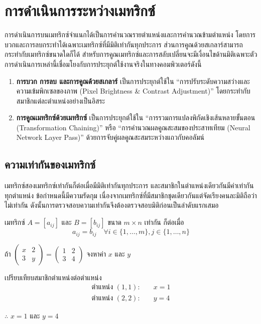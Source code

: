 \section{การดำเนินการระหว่างเมทริกซ์}
\label{sec:matrix-operations}

การดำเนินการบนเมทริกซ์จำแนกได้เป็นการคำนวณรายตำแหน่งและการคำนวณข้ามตำแหน่ง โดยการบวกและการลบกระทำได้เฉพาะเมทริกซ์ที่มีมิติเท่ากันทุกประการ ส่วนการคูณด้วยสเกลาร์สามารถกระทำกับเมทริกซ์ขนาดใดก็ได้ สำหรับการคูณเมทริกซ์และการสลับเปลี่ยนจะมีเงื่อนไขด้านมิติเฉพาะตัว การดำเนินการเหล่านี้เชื่อมโยงกับการประยุกต์ใช้งานจริงในทางคอมพิวเตอร์ดังนี้~\parencite{kolman2008discrete}
\begin{enumerate}[label=\textbf{\arabic*.}]
    \item \textbf{การบวก การลบ และการคูณด้วยสเกลาร์} เป็นการประยุกต์ใช้ใน ``การปรับระดับความสว่างและความเข้มพิกเซลของภาพ (Pixel Brightness \& Contrast Adjustment)'' โดยกระทำกับสมาชิกแต่ละตำแหน่งอย่างเป็นอิสระ
    \item \textbf{การคูณเมทริกซ์ด้วยเมทริกซ์} เป็นการประยุกต์ใช้ใน ``การรวมการแปลงพิกัดเชิงเส้นหลายขั้นตอน (Transformation Chaining)'' หรือ ``การคำนวณผลคูณสะสมของประสาทเทียม (Neural Network Layer Pass)'' ด้วยการจับคู่ผลคูณสะสมระหว่างแถวกับคอลัมน์
\end{enumerate}

\subsection{ความเท่ากันของเมทริกซ์}
\label{ssec:matrix-equality}
เมทริกซ์สองเมทริกซ์เท่ากันก็ต่อเมื่อมีมิติเท่ากันทุกประการ และสมาชิกในตำแหน่งเดียวกันมีค่าเท่ากันทุกตำแหน่ง ข้อกำหนดนี้มีความรัดกุม เนื่องจากเมทริกซ์ที่มีสมาชิกชุดเดียวกันแต่จัดเรียงคนละมิติถือว่าไม่เท่ากัน ดังนั้นการตรวจสอบความเท่ากันจึงต้องตรวจสอบมิติก่อนเป็นลำดับแรกเสมอ~\parencite{lipschutz2009discrete}

\begin{definition}
เมทริกซ์ $A = [a_{ij}]$ และ $B = [b_{ij}]$ ขนาด $m \times n$ เท่ากัน ก็ต่อเมื่อ
\[ a_{ij} = b_{ij} \quad \forall i \in \{1,\ldots,m\}, j \in \{1,\ldots,n\} \]
\end{definition}

\begin{ex}
\label{ex:matrix-equality}
ถ้า $\begin{pmatrix} x & 2 \\ 3 & y \end{pmatrix} = \begin{pmatrix} 1 & 2 \\ 3 & 4 \end{pmatrix}$ จงหาค่า $x$ และ $y$
\end{ex}
\begin{solution}
เปรียบเทียบสมาชิกตำแหน่งต่อตำแหน่ง \begin{align*}
    \text{ตำแหน่ง } (1, 1): & \quad x = 1\\
    \text{ตำแหน่ง } (2, 2): & \quad y = 4
    \end{align*}

$\therefore$ $x = 1$ และ $y = 4$ \solhere
\end{solution}

